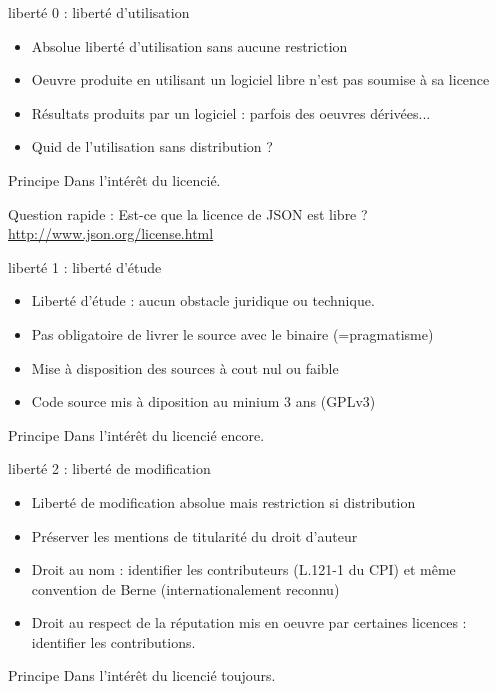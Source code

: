 \documentclass{beamer}
\begin{document}
\begin{frame}{liberté 0 : liberté d'utilisation}
  \begin{itemize}
  \item Absolue liberté d'utilisation sans aucune restriction
  \item Oeuvre produite en utilisant un logiciel libre n'est pas
    soumise à sa licence
  \item Résultats produits par un logiciel : parfois des oeuvres
    dérivées...
  \item Quid de l'utilisation sans distribution ?
  \end{itemize}

  \begin{alertblock}{Principe}
    Dans l'intérêt du licencié.
  \end{alertblock}
  
  Question rapide : Est-ce que la licence de JSON est libre ?
  \url{http://www.json.org/license.html}

\end{frame}


\begin{frame}{liberté 1 : liberté d'étude}
  \begin{itemize}
  \item Liberté d'étude : aucun obstacle juridique ou technique.
  \item Pas obligatoire de livrer le source avec le binaire
    (=pragmatisme)
  \item Mise à disposition des sources à cout nul ou faible
  \item Code source mis à diposition au minium 3 ans (GPLv3)
  \end{itemize}
  \begin{alertblock}{Principe}
    Dans l'intérêt du licencié encore.
  \end{alertblock}
\end{frame}


\begin{frame}{liberté 2 : liberté de modification}
  \begin{itemize}
  \item Liberté de modification absolue mais restriction si
    distribution
  \item Préserver les mentions de titularité du droit d'auteur
  \item Droit au nom : identifier les contributeurs (L.121-1 du CPI)
    et même convention de Berne (internationalement reconnu)
  \item Droit au respect de la réputation mis en oeuvre par certaines
    licences : identifier les contributions.
  \end{itemize}
  \begin{alertblock}{Principe}
    Dans l'intérêt du licencié toujours.
  \end{alertblock}
\end{frame}
\end{document}
